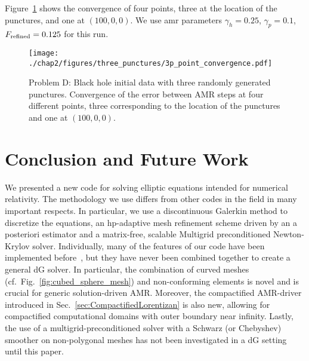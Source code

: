 Figure~\ref{fig:three_punctures_convergence} shows the convergence of four points, three at the location of the punctures, and one at $(100,0,0)$. We use amr parameters $\gamma_h=0.25$, $\gamma_p=0.1$, $F_{\rm refined}=0.125$ for this run.

\begin{figure}
  \centering
  \texttt{[image: ./chap2/figures/three\_punctures/3p\_point\_convergence.pdf]}
  \caption{Problem D: Black hole initial data with three randomly generated punctures.  Convergence of the error between AMR steps at four different points, three corresponding to the location of the punctures and one at $(100,0,0)$.
  }
  \label{fig:three_punctures_convergence} 
\end{figure}

%
\section{Conclusion and Future Work}
\label{sec:Conclusions}


We presented a new code for solving
elliptic equations intended for numerical
relativity. The methodology we use differs from other codes in the
field in many important respects. In particular, we use a
discontinuous Galerkin method to discretize the equations, an
hp-adaptive mesh refinement scheme driven by an a posteriori estimator
and a matrix-free, scalable Multigrid preconditioned Newton-Krylov
solver.
Individually, many of the features of our
  code have been implemented before~\cite{kozdon2018energy,kozdon2019robust,stiller2017robust,sundar2012parallel,hesthaven2008nodal}, but they have never been combined together to create a general dG solver.  In particular, the combination of curved meshes (cf.\ Fig.~\ref{fig:cubed_sphere_mesh}) and non-conforming elements
  is novel and is crucial for generic solution-driven AMR.  Moreover,
  the compactified AMR-driver introduced in
  Sec.~\ref{sec:CompactifiedLorentizan} is also new, allowing for compactified computational domains with outer boundary near infinity. Lastly, the use of a multigrid-preconditioned solver with a Schwarz (or Chebyshev) smoother on non-polygonal meshes has not been investigated in a dG setting until this paper.


